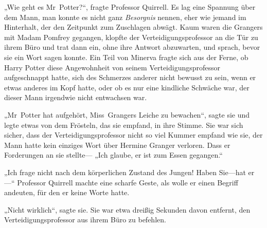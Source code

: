 „Wie geht es Mr~Potter?“, fragte Professor Quirrell.
Es lag eine Spannung über dem Mann, man konnte es nicht ganz \emph{Besorgnis} nennen, eher wie jemand im Hinterhalt, der den Zeitpunkt zum Zuschlagen abwägt. Kaum waren die Grangers mit Madam Pomfrey gegangen, klopfte der Verteidigungsprofessor an die Tür zu ihrem Büro und trat dann ein, ohne ihre Antwort abzuwarten, und sprach, bevor sie ein Wort sagen konnte. Ein Teil von Minerva fragte sich aus der Ferne, ob Harry Potter diese Angewohnheit von seinem Verteidigungsprofessor aufgeschnappt hatte, sich des Schmerzes anderer nicht bewusst zu sein, wenn er etwas anderes im Kopf hatte, oder ob es nur eine kindliche Schwäche war, der dieser Mann irgendwie nicht entwachsen war.

„Mr~Potter hat aufgehört, Miss~Grangers Leiche zu bewachen“, sagte sie und legte etwas von dem Frösteln, das sie empfand, in ihre Stimme.
Sie war sich sicher, dass der Verteidigungsprofessor nicht so viel Kummer empfand wie sie, der Mann hatte kein einziges Wort über Hermine Granger verloren. Dass er Forderungen an sie stellte—
„Ich glaube, er ist zum Essen gegangen.“

„Ich frage nicht nach dem körperlichen Zustand des Jungen! Haben Sie—hat er—“ Professor Quirrell machte eine scharfe Geste, als wolle er einen Begriff andeuten, für den er keine Worte hatte.

„Nicht wirklich“, sagte sie.
Sie war etwa dreißig Sekunden davon entfernt, den Verteidigungsprofessor aus ihrem Büro zu befehlen.

